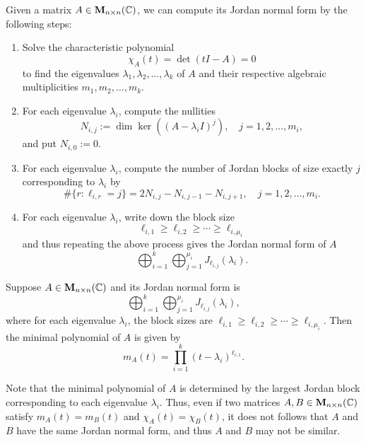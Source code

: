 \begin{methodenv}
    Given a matrix $A\in \mathbf{M}_{n\times n}(\mathbb{C})$, we can compute its Jordan normal form by the following steps:
    \begin{enumerate}[label=(\arabic*)]
        \item Solve the characteristic polynomial
        $$ \chi_A(t) = \det(tI - A) = 0 $$
        to find the eigenvalues $\lambda_1, \lambda_2, \ldots, \lambda_k$ of $A$ and their respective algebraic multiplicities $m_1, m_2, \ldots, m_k$.
        \item For each eigenvalue $\lambda_i$, compute the nullities
        $$ N_{i,j} := \dim \ker \left( (A-\lambda_i I)^j \right), \quad j=1,2,\ldots,m_i, $$
        and put $N_{i,0} := 0$.
        \item For each eigenvalue $\lambda_i$, compute the number of Jordan blocks of size exactly $j$ corresponding to $\lambda_i$ by
        $$ \# \{ r : \ell_{i,r} = j \} = 2 N_{i,j} - N_{i,j-1} - N_{i,j+1}, \quad j=1,2,\ldots,m_i. $$
        \item For each eigenvalue $\lambda_i$, write down the block size
        $$ \ell_{i,1} \ge \ell_{i,2} \ge \cdots \ge \ell_{i,\mu_i} $$
        and thus repeating the above process gives the Jordan normal form of $A$
        $$ \bigoplus_{i=1}^k \bigoplus_{j=1}^{\mu_i} J_{\ell_{i,j}}(\lambda_i). $$
        
    \end{enumerate}
\end{methodenv}
\begin{corollaryenv}
    Suppose $A\in \mathbf{M}_{n\times n}(\mathbb{C})$ and its Jordan normal form is
    $$ \bigoplus_{i=1}^k \bigoplus_{j=1}^{\mu_i} J_{\ell_{i,j}}(\lambda_i), $$
    where for each eigenvalue $\lambda_i$, the block sizes are
    $ \ell_{i,1} \ge \ell_{i,2} \ge \cdots \ge \ell_{i,\mu_i}. $
    Then the minimal polynomial of $A$ is given by
    $$ m_A(t) = \prod_{i=1}^k (t - \lambda_i)^{\ell_{i,1}}. $$
\end{corollaryenv}
\begin{remarkenv}
    Note that the minimal polynomial of $A$ is determined by the largest Jordan block corresponding to each eigenvalue $\lambda_i$. Thus, even if two matrices $A,B\in \mathbf{M}_{n\times n}(\mathbb{C})$ satisfy $m_A(t) = m_B(t)$ and $\chi_A(t) = \chi_B(t)$, it does not follows that $A$ and $B$ have the same Jordan normal form, and thus $A$ and $B$ may not be similar.
\end{remarkenv}
\newpage

